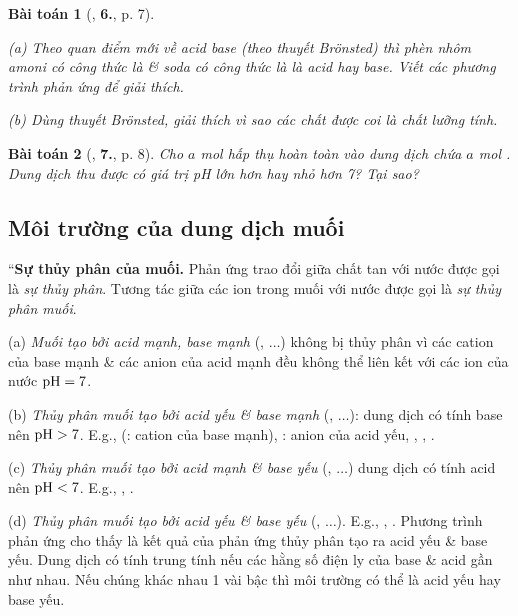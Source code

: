 \documentclass{article}
\numberwithin{equation}{section}
\newtheorem{baitoan}{Bài toán}[section]
\begin{document}
\begin{baitoan}[\cite{An2004}, \textbf{6.}, p. 7]
	\begin{enumerate*}
		\item[(a)] Theo quan điểm mới về acid base (theo thuyết Br\"onsted) thì phèn nhôm amoni có công thức là \emph{} \& soda có công thức là \emph{} là acid hay base. Viết các phương trình phản ứng để giải thích.
		\item[(b)] Dùng thuyết Br\"onsted, giải thích vì sao các chất \emph{} được coi là chất lưỡng tính.
	\end{enumerate*}
\end{baitoan}

\begin{baitoan}[\cite{An2004}, \textbf{7.}, p. 8]
	Cho $a$ mol \emph{} hấp thụ hoàn toàn vào dung dịch chứa $a$ mol \emph{}. Dung dịch thu được có giá trị pH lớn hơn hay nhỏ hơn 7? Tại sao?
\end{baitoan}

\subsection{Môi trường của dung dịch muối}
``\textbf{Sự thủy phân của muối.} Phản ứng trao đổi giữa chất tan với nước được gọi là \textit{sự thủy phân}. Tương tác giữa các ion trong muối với nước được gọi là \textit{sự thủy phân muối}.
\begin{enumerate*}
	\item[(a)] \textit{Muối tạo bởi acid mạnh, base mạnh} (, $\ldots$) không bị thủy phân vì các cation của base mạnh \& các anion của acid mạnh đều không thể liên kết với các ion của nước $\rm pH = 7$.
	\item[(b)] \textit{Thủy phân muối tạo bởi acid yếu \& base mạnh} (, $\ldots$): dung dịch có tính base nên $\rm pH > 7$. E.g.,  (: cation của base mạnh), : anion của acid yếu, , , \ce{CO3^2- + H2O <=> HCO3- + OH-}.
	\item[(c)] \textit{Thủy phân muối tạo bởi acid mạnh \& base yếu} (, $\ldots$) dung dịch có tính acid nên $\rm pH < 7$. E.g., , \ce{NH4^+ + H2O <=> NH3 + H3O^+}.
	\item[(d)] \textit{Thủy phân muối tạo bởi acid yếu \& base yếu} (, $\ldots$). E.g., , . Phương trình phản ứng cho thấy là kết quả của phản ứng thủy phân tạo ra acid yếu \& base yếu. Dung dịch có tính trung tính nếu các hằng số điện ly của base \& acid gần như nhau. Nếu chúng khác nhau 1 vài bậc thì môi trường có thể là acid yếu hay base yếu.
\end{enumerate*}
\end{document}
